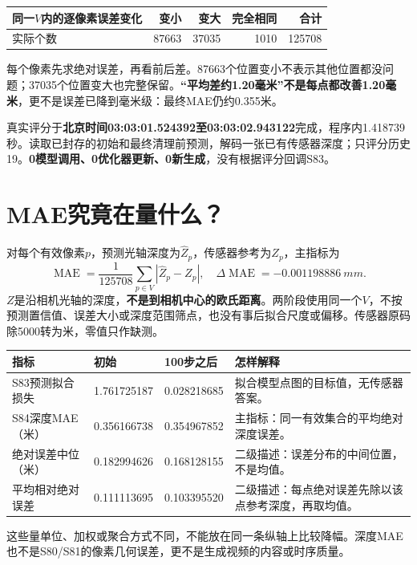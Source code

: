 \documentclass[UTF8,11pt,a4paper]{ctexart}
\begin{document}
\begin{center}\small
\begin{tabular}{lrrrr}\toprule
同一$V$内的逐像素误差变化&变小&变大&完全相同&合计\\\midrule
实际个数&87663&37035&1010&125708\\\bottomrule
\end{tabular}\end{center}
每个像素先求绝对误差，再看前后差。87663个位置变小不表示其他位置都没问题；37035个位置变大也完整保留。\textbf{“平均差约1.20毫米”不是每点都改善1.20毫米}，更不是误差已降到毫米级：最终MAE仍约0.355米。

真实评分于\textbf{北京时间03:03:01.524392至03:03:02.943122}完成，程序内1.418739秒。读取已封存的初始和最终清理前预测，解码一张已有传感器深度；只评分历史19。\textbf{0模型调用、0优化器更新、0新生成}，没有根据评分回调S83。
\clearpage

\section{ MAE究竟在量什么？}
对每个有效像素$p$，预测光轴深度为$\hat Z_p$，传感器参考为$Z_p$，主指标为
\[
\operatorname{MAE}=\frac{1}{125708}\sum_{p\in V}|\hat Z_p-Z_p|,
\quad \Delta\operatorname{MAE}=-0.001198886\ {
m m}.
\]
$Z$是沿相机光轴的深度，\textbf{不是到相机中心的欧氏距离}。两阶段使用同一个$V$，不按预测置信值、误差大小或深度范围筛点，也没有事后拟合尺度或偏移。传感器原码除5000转为米，零值只作缺测。

\begin{center}\small
\begin{tabular}{p{3.6cm}p{3.0cm}p{3.0cm}p{5.0cm}}\toprule
指标&初始&100步之后&怎样解释\\\midrule
S83预测拟合损失&1.761725187&0.028218685&拟合模型点图的目标值，无传感器答案。\\
S84深度MAE（米）&0.356166738&0.354967852&主指标：同一有效集合的平均绝对深度误差。\\
绝对误差中位（米）&0.182994626&0.168128155&二级描述：误差分布的中间位置，不是均值。\\
平均相对绝对误差&0.111113695&0.103395520&二级描述：每点绝对误差先除以该点参考深度，再取均值。\\\bottomrule
\end{tabular}\end{center}
这些量单位、加权或聚合方式不同，不能放在同一条纵轴上比较降幅。深度MAE也不是S80/S81的像素几何误差，更不是生成视频的内容或时序质量。
\end{document}

